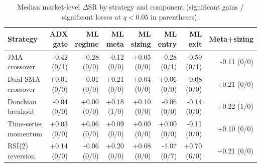 \begin{table}[!t]
\centering
\caption{Median market-level $\Delta$SR by strategy and component (significant gains / significant losses at $q<0.05$ in parentheses).}
\label{tab:s2bystrat}
\footnotesize
\begin{tabular}{l r r r r r r r}
\toprule
Strategy & ADX gate & ML regime & ML meta & ML sizing & ML entry & ML exit & Meta+sizing \\
\midrule
JMA crossover & -0.42 (0/1) & -0.28 (0/0) & -0.12 (0/0) & +0.05 (0/0) & -0.28 (0/1) & -0.59 (0/1) & -0.11 (0/0) \\
Dual SMA crossover & +0.01 (0/0) & -0.01 (0/0) & +0.21 (0/0) & +0.04 (0/0) & +0.06 (0/0) & -0.08 (0/0) & +0.21 (0/0) \\
Donchian breakout & -0.04 (0/0) & +0.00 (0/0) & +0.18 (1/0) & +0.10 (0/0) & -0.06 (0/0) & -0.14 (0/0) & +0.22 (1/0) \\
Time-series momentum & +0.03 (0/0) & +0.06 (0/0) & +0.09 (0/0) & +0.00 (0/0) & +0.00 (0/0) & -0.11 (0/0) & +0.10 (0/0) \\
RSI(2) reversion & +0.14 (0/0) & -0.06 (0/0) & +0.20 (0/0) & +0.08 (0/0) & -1.07 (0/7) & +0.70 (6/0) & +0.21 (0/0) \\
\bottomrule
\end{tabular}
\end{table}
